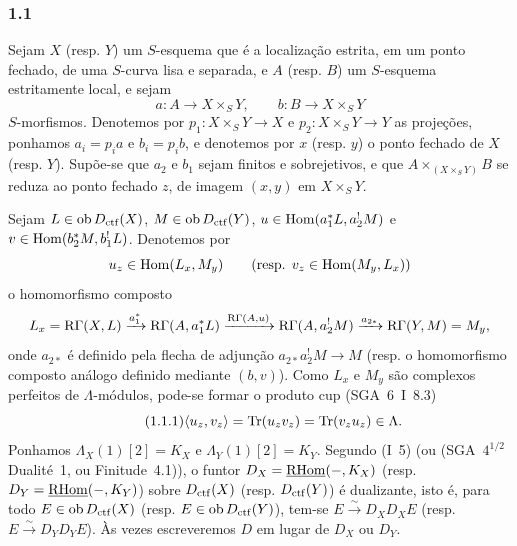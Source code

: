 \subsubsection*{1.1}
Sejam $X$ (resp. $Y$) um $S$-esquema que é a localização estrita, em um ponto fechado, de uma $S$-curva lisa e separada, e $A$ (resp. $B$) um $S$-esquema estritamente local, e sejam
\[
a:A\longrightarrow X\times_S Y,
\qquad
b:B\longrightarrow X\times_S Y
\]
$S$-morfismos. Denotemos por $p_1:X\times_S Y\to X$ e $p_2:X\times_S Y\to Y$ as projeções, ponhamos $a_i=p_i a$ e $b_i=p_i b$, e denotemos por $x$ (resp. $y$) o ponto fechado de $X$ (resp. $Y$). Supõe-se que $a_2$ e $b_1$ sejam finitos e sobrejetivos, e que $A\times_{(X\times_S Y)}B$ se reduza ao ponto fechado $z$, de imagem $(x,y)$ em $X\times_S Y$.

Sejam $L\in \operatorname{ob} D_{\mathrm{ctf}}(X)$, $M\in \operatorname{ob} D_{\mathrm{ctf}}(Y)$, $u\in\operatorname{Hom}(a_1^*L,a_2^!M)$ e $v\in\operatorname{Hom}(b_2^*M,b_1^!L)$. Denotemos por
\[
u_z\in\operatorname{Hom}(L_x,M_y)\qquad (\text{resp. }v_z\in\operatorname{Hom}(M_y,L_x))
\]
o homomorfismo composto
\[
L_x=\mathrm{R}\Gamma(X,L)\xrightarrow{a_1^*}\mathrm{R}\Gamma(A,a_1^*L)
\xrightarrow{\mathrm{R}\Gamma(A,u)}\mathrm{R}\Gamma(A,a_2^!M)
\xrightarrow{a_{2*}}\mathrm{R}\Gamma(Y,M)=M_y,
\]
onde $a_{2*}$ é definido pela flecha de adjunção $a_{2*}a_2^!M\to M$ (resp. o homomorfismo composto análogo definido mediante $(b,v)$). Como $L_x$ e $M_y$ são complexos perfeitos de $\Lambda$-módulos, pode-se formar o produto cup (SGA~6~I~8.3)
\begin{equation}\tag{1.1.1}
\langle u_z,v_z\rangle=\operatorname{Tr}(u_zv_z)=\operatorname{Tr}(v_zu_z)\in\Lambda.
\end{equation}
Ponhamos $\Lambda_X(1)[2]=K_X$ e $\Lambda_Y(1)[2]=K_Y$. Segundo (I~5) (ou (SGA~$4^{1/2}$ Dualité~1, ou Finitude~4.1)), o funtor $D_X=\underline{\mathrm{RHom}}(-,K_X)$ (resp. $D_Y=\underline{\mathrm{RHom}}(-,K_Y)$) sobre $D_{\mathrm{ctf}}(X)$ (resp. $D_{\mathrm{ctf}}(Y)$) é dualizante, isto é, para todo $E\in\operatorname{ob} D_{\mathrm{ctf}}(X)$ (resp. $E\in\operatorname{ob} D_{\mathrm{ctf}}(Y)$), tem-se $E\xrightarrow{\sim}D_XD_XE$ (resp. $E\xrightarrow{\sim}D_YD_YE$). Às vezes escreveremos $D$ em lugar de $D_X$ ou $D_Y$.

